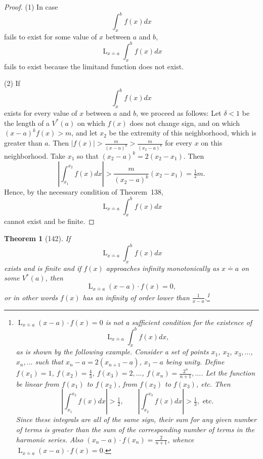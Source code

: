 \documentclass[a4paper,12pt]{book}[2004/02/16]
\providecommand{\hyperlink}[2]{#2}
\providecommand{\hypertarget}[2]{#2}
\theoremstyle{ilemma}
\theoremstyle{itheorem}
\newtheorem{theorem}{Theorem}
\theoremstyle{iother}
\theoremstyle{icorollary}
\theoremstyle{numcorollary}
\theoremstyle{idefinition}
\renewcommand{\dfrac}[2]{\frac{#1}{#2}}%
\begin{document}
\begin{proof}(1) In case
\[
  \int_x^b f(x)dx
\]
fails to exist for some value of $x$ between $a$ and $b$,
\[
  \mathop{L}_{x \doteq a} \int_x^b f(x) dx
\]
fails to exist because the limitand function does not exist.

(2) If
\[
  \int_x^b f(x)dx
\]
exists for every value of $x$ between $a$ and $b$, we proceed as
follows: Let $\delta<1$ be the length of a $V^*(a)$ on which $f(x)$
does not change sign, and on which $(x-a)^kf(x)>m$, and let $x_2$ be
the extremity of this neighborhood, which is greater than $a$. Then
$|f(x)|>\dfrac{m}{(x-a)^k}>\dfrac{m}{(x_2-a)^k}$ for every $x$ on this
neighborhood.  Take $x_1$ so that $(x_2-a)^k=2(x_2-x_1)$.
Then
\[
  \left|\int_{x_1}^{x_2}f(x)dx\right| >
  \frac{m}{(x_2-a)^k} (x_2-x_1) = \tfrac{1}{2}m.
\]
Hence, by the necessary condition of Theorem~\hyperlink{thm138}{138},
\[
  \mathop{L}_{x\doteq a} \int_x^b f(x) dx
\]
cannot exist and be finite.
\end{proof}

\begin{theorem}[142]\hypertarget{thm142}{}
If
\[
  \mathop{L}_{x\doteq a}\int_x^b f(x)dx
\]
exists and is finite and if $f(x)$ approaches infinity monotonically
as $x\doteq a$ on some $V^*(a)$, then
\[
  \mathop{L}_{x\doteq a} (x-a) \cdot f(x) = 0,
\]
or in other words $f(x)$ has an infinity of order lower than
$\dfrac{1}{x-a}$.\footnote{%
  $\displaystyle\mathop{L}_{x\doteq a} (x-a)\cdot f(x) =0$ is not a
  sufficient condition for the existence of
  \[
    \mathop{L}_{x\doteq a} \int_x^b f(x)dx,
  \]
  as is shown by the following example. Consider a set of points
  $x_1$, $x_2$, $x_3,\ldots$, $x_n,\ldots$ such that $x_n-a =
  2(x_{n+1}-a)$, $x_1-a$ being unity.
  Define $f(x_1)=1$, $f(x_2)=\frac43$, $f(x_3)=2,\ldots$,
  $f(x_n)=\dfrac{2^n}{n+1},\ldots$. Let the function be linear from
  $f(x_1)$ to $f(x_2)$, from $f(x_2)$ to $f(x_3)$, etc. Then
  \[
    \left| \int_{x_1}^{x_2} f(x)dx\right| > \tfrac{1}{2}, \qquad
    \left| \int_{x_2}^{x_3} f(x)dx\right| > \tfrac{1}{3},
    \text{ etc.}
  \]
  Since these integrals are all of the same sign, their sum for any
  given number of terms is greater than the sum of the corresponding
  number of terms in the harmonic series. Also $(x_n-a) \cdot f(x_n) =
  \dfrac{2}{n+1}$, whence $\displaystyle\mathop{L}_{x\doteq a} (x-a)\cdot f(x)=0$.
  } %
\end{theorem}
\end{document}
